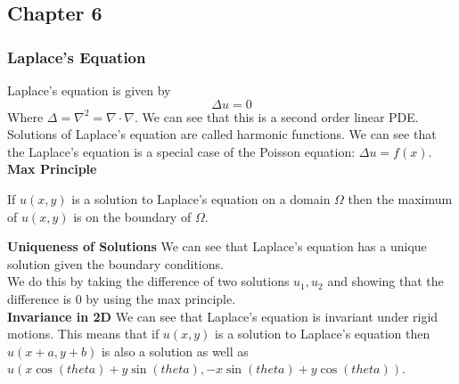 \documentclass[answers,12pt,addpoints]{exam}
\begin{document}
    \subsection{Chapter 6}
    \subsubsection{Laplace's Equation}
    Laplace's equation is given by
    $$ \Delta u = 0$$
    Where $\Delta = \nabla^2 = \nabla \cdot \nabla$. We can see that this is a second order linear PDE. \\
    Solutions of Laplace's equation are called harmonic functions. We can see that the Laplace's equation is a special case of the Poisson equation: $\Delta u = f(x)$.\\
    \textbf{Max Principle}
    \begin{theorem}
        If $u(x, y)$ is a solution to Laplace's equation on a domain $\Omega$ then the maximum of $u(x, y)$ is on the boundary of $\Omega$.
    \end{theorem}
    \textbf{Uniqueness of Solutions}
    We can see that Laplace's equation has a unique solution given the boundary conditions.\\
    We do this by taking the difference of two solutions $u_1, u_2$ and showing that the difference is 0 by using the max principle.\\
    \textbf{Invariance in 2D}
    We can see that Laplace's equation is invariant under rigid motions. This means that if $u(x, y)$ is a solution to Laplace's equation then $u(x+a, y+b)$ is also a solution as well as $u(x \cos(theta) + y \sin(theta), -x \sin(theta) + y \cos(theta))$.\\
    
\end{document}
